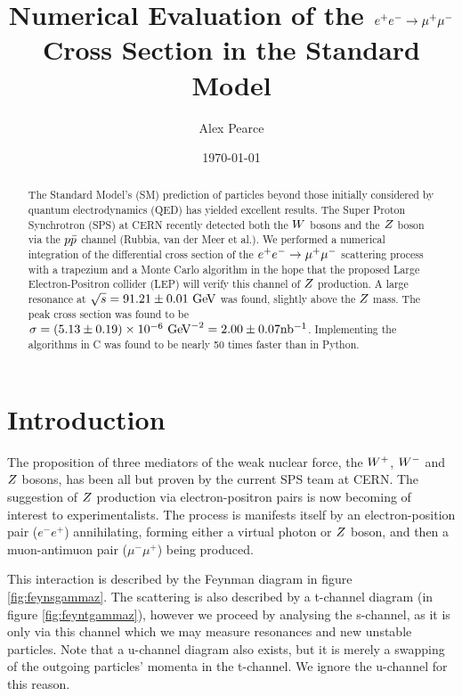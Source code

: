 \documentclass[]{article}
\providecommand{\e}[1]{\ensuremath{\times 10^{#1}}}
\begin{document}
\title{Numerical Evaluation of the $e^+ e^-  \rightarrow \mathrm{\mu^+ \mu^-} $ Cross Section in the Standard Model}
\author{Alex Pearce}
\date{\today}
\maketitle


\begin{abstract}
The Standard Model's (SM) prediction of particles beyond those initially considered by quantum electrodynamics (QED) has yielded excellent results. The Super Proton Synchrotron (SPS) at CERN recently detected both the $W $ bosons and the $Z $ boson via the $p\bar{p}$ channel (Rubbia, van der Meer et al.). We performed a numerical integration of the differential cross section of the $e^+ e^-  \rightarrow \mathrm{\mu^+ \mu^-} $ scattering process with a trapezium and a Monte Carlo algorithm in the hope that the proposed Large Electron-Positron collider (LEP) will verify this channel of $Z $ production. A large resonance at $\sqrt{s}=91.21\pm0.01\GeV$ was found, slightly above the $Z $ mass. The peak cross section was found to be $\sigma=(5.13\pm0.19)\e{-6}\GeV^{-2}=2.00\pm0.07\inb$. Implementing the algorithms in C was found to be nearly 50 times faster than in Python.
\end{abstract}


\section{Introduction}\label{sec:intro}

The proposition of three mediators of the weak nuclear force, the $W^+ $, $W^- $ and $Z $ bosons, has been all but proven by the current SPS team at CERN. The suggestion of $Z $ production via electron-positron pairs is now becoming of interest to experimentalists. The process is manifests itself by an electron-position pair ($e^{-}e^{+}$) annihilating, forming either a virtual photon or $Z $ boson, and then a muon-antimuon pair ($\mu^{-}\mu^{+}$) being produced.

This interaction is described by the Feynman diagram in figure \ref{fig:feynsgammaz}. The scattering is also described by a t-channel diagram (in figure \ref{fig:feyntgammaz}), however we proceed by analysing the s-channel, as it is only via this channel which we may measure resonances and new unstable particles. Note that a u-channel diagram also exists, but it is merely a swapping of the outgoing particles' momenta in the t-channel. We ignore the u-channel for this reason.
\end{document}
